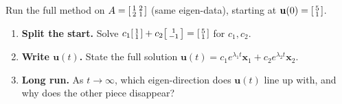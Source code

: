 \documentclass[10pt]{article}
\newcommand{\uu}{\mathbf{u}}
\newcommand{\xx}{\mathbf{x}}
\begin{document}
\begin{tcolorbox}[colback=white, colframe=black!40, title=\textbf{Tier A --- Approaching Proficiency},
    fonttitle=\bfseries, arc=1.5mm, left=3mm, right=3mm, top=2mm, bottom=2mm, breakable]
Run the full method on $A=\begin{bsmallmatrix} 1 & 2\\ 2 & 1 \end{bsmallmatrix}$ (same eigen-data), starting at
$\uu(0)=\begin{bsmallmatrix}5\\1\end{bsmallmatrix}$.
\begin{enumerate}[leftmargin=1.7em, itemsep=9pt]
  \item \textbf{Split the start.} Solve $c_1\begin{bsmallmatrix}1\\1\end{bsmallmatrix}+c_2\begin{bsmallmatrix}1\\-1\end{bsmallmatrix}=\begin{bsmallmatrix}5\\1\end{bsmallmatrix}$ for $c_1,c_2$. 
  \item \textbf{Write $\uu(t)$.} State the full solution $\uu(t)=c_1e^{\lambda_1 t}\xx_1+c_2e^{\lambda_2 t}\xx_2$. \writeline
  \item \textbf{Long run.} As $t\to\infty$, which eigen-direction does $\uu(t)$ line up with, and why does the other piece disappear? 
\end{enumerate}
\end{tcolorbox}
\end{document}
